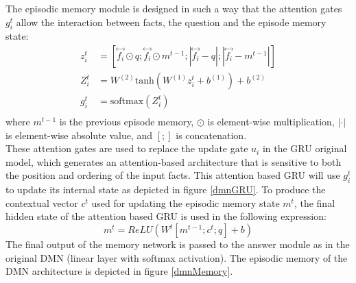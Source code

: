 \documentclass{article}
\begin{document}
The episodic memory module is designed in such a way that the attention gates $g_i^t$ allow the interaction between facts, the question and the episode memory state:
\begin{align*}
    z_i^t &= [\overset{\longleftrightarrow}{f_i} \odot q; \overset{\longleftrightarrow}{f_i} \odot m^{t-1}; |\overset{\longleftrightarrow}{f_i} - q|; |\overset{\longleftrightarrow}{f_i} - m^{t-1}|]\\
    Z_i^t &= W^{(2)}\text{tanh}\left(W^{(1)}z_i^t+b^{(1)}\right) + b^{(2)}\\
    g_i^t &= \text{softmax}(Z_i^t)\\
\end{align*}
where $m^{t-1}$ is the previous episode memory, $\odot$ is element-wise multiplication, $|\cdot|$ is element-wise absolute value, and $[;]$ is concatenation.\\
These attention gates are used to replace the update gate $u_i$ in the GRU original model, which generates an attention-based architecture that is sensitive to both the position and ordering of the input facts. This attention based GRU will use $g_i^t$ to update its internal state as depicted in figure \ref{dmnGRU}. To produce the contextual vector $c^t$ used for updating the episodic memory state $m^t$, the final hidden state of the attention based GRU is used in the following expression:
\begin{equation*}
    m^t = ReLU(W^t[m^{t-1};c^t;q] + b)
\end{equation*}
The final output of the memory network is passed to the answer module as in the original DMN (linear layer with softmax activation). The episodic memory of the DMN architecture is depicted in figure \ref{dmnMemory}.
\end{document}
